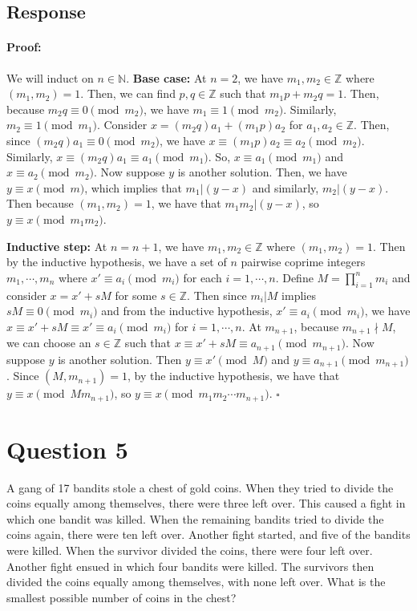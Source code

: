 \documentclass [12pt] {article}
\newcommand{\N}{\mathbb{N}}
\newcommand{\Z}{\mathbb{Z}}
\newenvironment{proof}{\paragraph{Proof:}}{\hfill$\square$}
\begin{document}
\subsection*{Response}
\begin{proof}
    We will induct on $n \in \N$. 
    \newline
    \textbf{Base case:} At $n = 2$, we have $m_1, m_2 \in \Z$ where $(m_1, m_2) = 1$. Then, we can 
    find $p, q \in \Z$ such that $m_1 p + m_2 q = 1$. Then, because $m_2 q \equiv 0 \pmod{m_2}$, we 
    have $m_1 \equiv 1 \pmod{m_2}$. Similarly, $m_2 \equiv 1 \pmod{m_1}$. Consider 
    $x = (m_2 q)a_1 + (m_1 p)a_2$ for $a_1, a_2 \in \Z$. Then, since $(m_2 q)a_1 \equiv 0 \pmod{m_2}$, we have
    $x \equiv (m_1 p)a_2 \equiv a_2 \pmod{m_2}$. Similarly, $x \equiv (m_2 q)a_1 \equiv a_1 \pmod{m_1}$.
    So, $x \equiv a_1 \pmod{m_1}$ and $x \equiv a_2 \pmod{m_2}$. Now suppose $y$ is another solution.
    Then, we have $y \equiv x \pmod{m}$, which implies that $m_1 | (y - x)$ and similarly, 
    $m_2 | (y - x)$. Then because $(m_1, m_2) = 1$, we have that $m_1 m_2 | (y - x)$,
    so $y \equiv x \pmod{m_1 m_2}$. \vspace{12pt}

    \textbf{Inductive step:} At $n = n + 1$, we have $m_1, m_2 \in \Z$ where $(m_1, m_2) = 1$. Then
    by the inductive hypothesis, we have a set of $n$ pairwise coprime integers $m_1, \cdots, m_n$
    where $x' \equiv a_i \pmod{m_i}$ for each $i = 1, \cdots, n$. Define $M = \prod^{n}_{i = 1} m_i$ 
    and consider $x = x' + sM$ for some $s \in \Z$. 
    Then since $m_i | M$ implies $sM \equiv 0 \pmod{m_i}$ and from the inductive hypothesis, 
    $x' \equiv a_i \pmod{m_i}$, we have $x \equiv x' + sM \equiv x' \equiv a_i \pmod{m_i}$ 
    for $i = 1, \cdots, n$. At $m_{n + 1}$, because $m_{n + 1} \nmid M$, 
    we can choose an $s \in \Z$ such that $x \equiv x' + sM \equiv a_{n + 1} \pmod{m_{n + 1}}$. Now 
    suppose $y$ is another solution. Then $y \equiv x' \pmod{M}$ and $y \equiv a_{n + 1} \pmod{m_{n + 1}}$.
    Since $(M, m_{n + 1}) = 1$, by the inductive hypothesis, we have that 
    $y \equiv x \pmod{M m_{n + 1}}$, so $y \equiv x \pmod{m_1 m_2 \cdots m_{n + 1}}$.
\end{proof}
\newpage

\section*{Question 5}
A gang of 17 bandits stole a chest of gold coins.
When they tried to divide the coins equally among themselves, there were three left over. This caused a fight in which one bandit was killed. When the remaining bandits tried to divide the coins again, there were ten left over.
Another fight started, and five of the bandits were killed. When the survivor divided the coins, there were four left over. Another fight ensued in which four bandits were killed. The survivors then divided the coins equally among themselves, with none left over. What is the smallest possible number of coins in the chest? 
\end{document}

